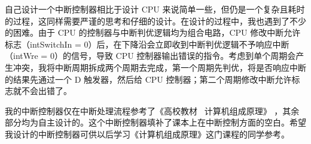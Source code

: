\documentclass{article}
\begin{document}
自己设计一个中断控制器相比于设计 CPU 来说简单一些，但仍是一个复杂且耗时的过程，这同样需要严谨的思考和仔细的设计。在设计的过程中，我也遇到了不少的困难。由于 CPU 的控制器与中断判优逻辑均为组合电路，CPU 修改中断允许标志（intSwitchIn = 0）后，在下降沿会立即收到中断判优逻辑不予响应中断（intWre = 0）的信号，导致 CPU 控制器输出错误的指令。考虑到单个周期会产生冲突，我将中断周期拆成两个周期去完成，第一个周期先判优，将是否响应中断的结果先通过一个 D 触发器，然后给 CPU 控制器；第二个周期修改中断允许标志就不会出错了。

我的中断控制器仅在中断处理流程参考了《高校教材 \ 计算机组成原理》 \cite{COD2} ，其余部分均为自主设计的。这个中断控制器填补了课本上在中断控制方面的空白。希望我设计的中断控制器可供以后学习《计算机组成原理》这门课程的同学参考。

\renewcommand\refname{参考文献}


\end{document}
